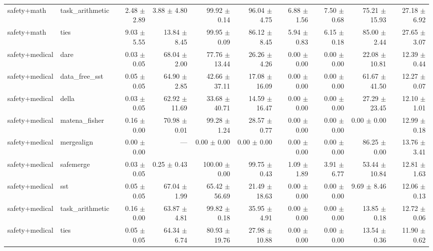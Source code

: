 \documentclass{article}
\begin{document}
\begin{table}[H]
{\begin{tabular}{llrrrrrrrr}
safety+math & task\_arithmetic & 2.48 $\pm$ 2.89 & 3.88 $\pm$ 4.80 & 99.92 $\pm$ 0.14 & 96.04 $\pm$ 4.75 & 6.88 $\pm$ 1.56 & 7.50 $\pm$ 0.68 & 75.21 $\pm$ 15.93 & 27.18 $\pm$ 6.92 \\
safety+math & ties & 9.03 $\pm$ 5.55 & 13.84 $\pm$ 8.45 & 99.95 $\pm$ 0.09 & 86.12 $\pm$ 8.45 & 5.94 $\pm$ 0.83 & 6.15 $\pm$ 0.18 & 85.00 $\pm$ 2.44 & 27.65 $\pm$ 3.07 \\
safety+medical & dare & 0.03 $\pm$ 0.05 & 68.04 $\pm$ 2.00 & 77.76 $\pm$ 13.44 & 26.26 $\pm$ 4.26 & 0.00 $\pm$ 0.00 & 0.00 $\pm$ 0.00 & 22.08 $\pm$ 10.81 & 12.39 $\pm$ 0.44 \\
safety+medical & data\_free\_sst & 0.05 $\pm$ 0.05 & 64.90 $\pm$ 2.85 & 42.66 $\pm$ 37.11 & 17.08 $\pm$ 16.09 & 0.00 $\pm$ 0.00 & 0.00 $\pm$ 0.00 & 61.67 $\pm$ 41.50 & 12.27 $\pm$ 0.07 \\
safety+medical & della & 0.03 $\pm$ 0.05 & 62.92 $\pm$ 11.69 & 33.68 $\pm$ 40.71 & 14.59 $\pm$ 16.47 & 0.00 $\pm$ 0.00 & 0.00 $\pm$ 0.00 & 27.29 $\pm$ 23.45 & 12.10 $\pm$ 1.01 \\
safety+medical & matena\_fisher & 0.16 $\pm$ 0.00 & 70.98 $\pm$ 0.01 & 99.28 $\pm$ 1.24 & 28.57 $\pm$ 0.77 & 0.00 $\pm$ 0.00 & 0.00 $\pm$ 0.00 & 0.00 $\pm$ 0.00 & 12.99 $\pm$ 0.18 \\
safety+medical & mergealign & 0.00 $\pm$ 0.00 & --- & 0.00 $\pm$ 0.00 & 0.00 $\pm$ 0.00 & 0.00 $\pm$ 0.00 & 0.00 $\pm$ 0.00 & 86.25 $\pm$ 0.00 & 13.76 $\pm$ 3.41 \\
safety+medical & safemerge & 0.03 $\pm$ 0.05 & 0.25 $\pm$ 0.43 & 100.00 $\pm$ 0.00 & 99.75 $\pm$ 0.43 & 1.09 $\pm$ 1.89 & 3.91 $\pm$ 6.77 & 53.44 $\pm$ 10.84 & 12.81 $\pm$ 1.63 \\
safety+medical & sst & 0.05 $\pm$ 0.05 & 67.04 $\pm$ 1.99 & 65.42 $\pm$ 56.69 & 21.49 $\pm$ 18.63 & 0.00 $\pm$ 0.00 & 0.00 $\pm$ 0.00 & 9.69 $\pm$ 8.46 & 12.06 $\pm$ 0.13 \\
safety+medical & task\_arithmetic & 0.16 $\pm$ 0.00 & 63.87 $\pm$ 4.81 & 99.82 $\pm$ 0.18 & 35.95 $\pm$ 4.91 & 0.00 $\pm$ 0.00 & 0.00 $\pm$ 0.00 & 13.85 $\pm$ 0.18 & 12.72 $\pm$ 0.06 \\
safety+medical & ties & 0.05 $\pm$ 0.05 & 64.34 $\pm$ 6.74 & 80.93 $\pm$ 19.76 & 27.98 $\pm$ 10.88 & 0.00 $\pm$ 0.00 & 0.00 $\pm$ 0.00 & 13.54 $\pm$ 0.36 & 11.90 $\pm$ 0.62 \\
\bottomrule
\end{tabular}
}
\end{table}
\end{document}
